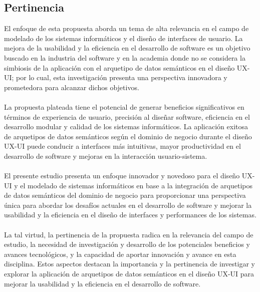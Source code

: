 \documentclass[12pt,a4paper]{article}
\begin{document}
\subsection{Pertinencia}
\label{sec:4}
El enfoque de esta propuesta aborda un tema de alta relevancia en el campo de modelado de los sistemas informáticos y el diseño de interfaces de usuario. La mejora de la usabilidad y la eficiencia en el desarrollo de software es un objetivo buscado en la industria del software y en la academia donde no se considera la simbiosis de la aplicación con el arquetipo de datos semánticos en el diseño UX-UI; por lo cual, esta investigación presenta una perspectiva innovadora y prometedora para alcanzar dichos objetivos.
\\\\
La propuesta plateada tiene el potencial de generar beneficios significativos en términos de experiencia de usuario, precisión al diseñar software, eficiencia en el desarrollo modular y calidad de los sistemas informáticos. La aplicación exitosa de arquetipos de datos semánticos según el dominio de negocio durante el diseño UX-UI puede conducir a interfaces más intuitivas, mayor productividad en el desarrollo de software y mejoras en la interacción usuario-sistema.
\\\\
El presente estudio presenta un enfoque innovador y novedoso para el diseño UX-UI y el modelado de sistemas informáticos en base a la integración de arquetipos de datos semánticos del dominio de negocio para proporcionar una perspectiva única para abordar los desafíos actuales en el desarrollo de software y mejorar la usabilidad y la eficiencia en el diseño de interfaces y performances de los sistemas.
\\\\
La tal virtud, la pertinencia de la propuesta radica en la relevancia del campo de estudio, la necesidad de investigación y desarrollo de los potenciales beneficios y avances tecnológicos, y la capacidad de aportar innovación y avance en esta disciplina. Estos aspectos destacan la importancia y la pertinencia de investigar y explorar la aplicación de arquetipos de datos semánticos en el diseño UX-UI para mejorar la usabilidad y la eficiencia en el desarrollo de software.

\end{document}
